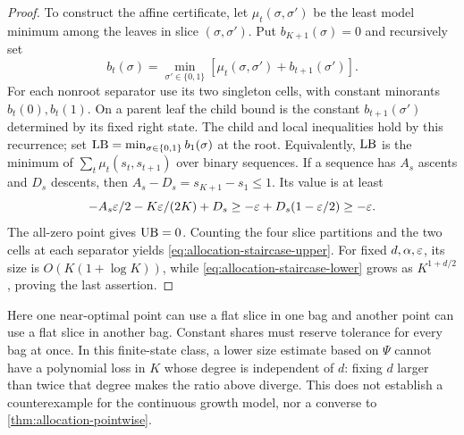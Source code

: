 \begin{proof}
To construct the affine certificate, let $\mu_t(\sigma,\sigma')$ be
the least model minimum among the leaves in slice $(\sigma,\sigma')$.
Put $b_{K+1}(\sigma)=0$ and recursively set
\[
 b_t(\sigma)=\min_{\sigma'\in\{0,1\}}
                  [\mu_t(\sigma,\sigma')+b_{t+1}(\sigma')].
\]
For each nonroot separator use its two singleton cells, with constant
minorants $b_t(0),b_t(1)$. On a parent leaf the child bound is the constant
$b_{t+1}(\sigma')$ determined by its fixed right state. The child and
local inequalities hold by this recurrence; set
$\mathrm{LB}=\min_{\sigma\in\{0,1\}}b_1(\sigma)$ at the root.
Equivalently, $\mathrm{LB}$ is the minimum of $\sum_t\mu_t(s_t,s_{t+1})$ over
binary sequences. If a sequence has $A_s$ ascents and $D_s$ descents,
then $A_s-D_s=s_{K+1}-s_1\le1$. Its value is at least
\[
 -A_s\varepsilon/2-K\varepsilon/(2K)+D_s
 \ge-\varepsilon+D_s(1-\varepsilon/2)\ge-\varepsilon.
\]
The all-zero point gives $\mathrm{UB}=0$. Counting the four slice partitions and
the two cells at each separator yields
\eqref{eq:allocation-staircase-upper}. For fixed $d,\alpha,\varepsilon$, its
size is $O(K(1+\log K))$, while
\eqref{eq:allocation-staircase-lower} grows as $K^{1+d/2}$, proving the
last assertion.
\end{proof}

Here one near-optimal point can use a flat slice in one bag and another
point can use a flat slice in another bag. Constant shares must reserve
tolerance for every bag at once. In this finite-state class, a lower size
estimate based on $\Psi$ cannot have a polynomial loss in $K$ whose degree
is independent of $d$: fixing $d$ larger than twice that degree makes
the ratio above diverge. This does not establish a counterexample for
the continuous growth model, nor a converse to
\cref{thm:allocation-pointwise}.

